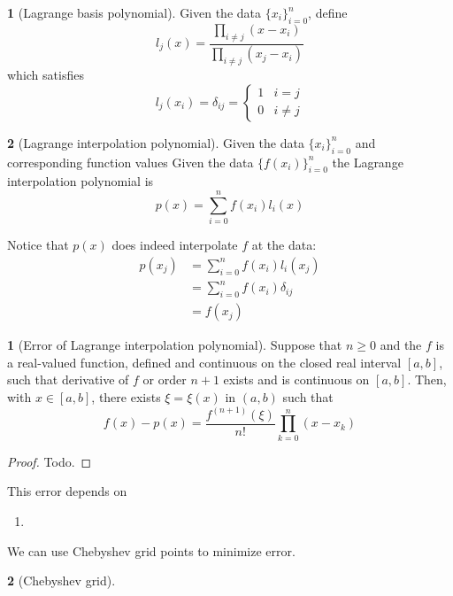 \documentclass[12pt]{article}
\theoremstyle{definition}
\newtheorem{definition}{\color{NavyBlue}{\textbf{Definition}}}
\newtheorem{theorem}{\color{ForestGreen}{\textbf{Theorem}}}
\theoremstyle{definition}
\begin{document}
\begin{definition}[Lagrange basis polynomial]
Given the data $\{x_i\}_{i=0}^n$, define
\begin{equation}
	l_j(x) = \frac{\prod_{i\neq j} (x-x_i)}{\prod_{i\neq j} (x_j-x_i)}
\end{equation}
which satisfies
\begin{equation}
	l_j(x_i) = \delta_{ij} =
	\begin{cases}
	1 & i=j \\
	0 & i\neq j
	\end{cases}
\end{equation}
\end{definition}

\begin{definition}[Lagrange interpolation polynomial]
	Given the data $\{x_i\}_{i=0}^n$ and corresponding function values Given the data $\{f(x_i)\}_{i=0}^n$ the Lagrange interpolation polynomial is 
	\begin{equation}
		p(x) = \sum_{i=0}^n f(x_i) l_i(x)
	\end{equation}
\end{definition}
Notice that $p(x)$ does indeed interpolate $f$ at the data:
\begin{align*}
	p(x_j) &= \sum_{i=0}^n f(x_i) l_i(x_j) \\
	&= \sum_{i=0}^n f(x_i) \delta_{ij} \\
	&= f(x_j)
\end{align*}

\begin{theorem}[Error of Lagrange interpolation polynomial]
	Suppose that $n\geq 0$ and the $f$ is a real-valued function, defined and continuous on the closed real interval $[a,b]$, such that derivative of $f$ or order $n+1$ exists and is continuous on $[a,b]$. Then, with $x \in [a,b]$, there exists $\xi = \xi(x)$ in $(a,b)$ such that
	\begin{equation}
		f(x) - p(x) = \frac{f^{(n+1)}(\xi)}{n!} \prod_{k=0}^n (x-x_k)
	\end{equation}
\end{theorem}
\begin{proof}
Todo.
\end{proof}

This error depends on
\begin{enumerate}
	\item 
\end{enumerate}

We can use Chebyshev grid points to minimize error.
\begin{theorem}[Chebyshev grid]

\end{theorem}
\end{document}
